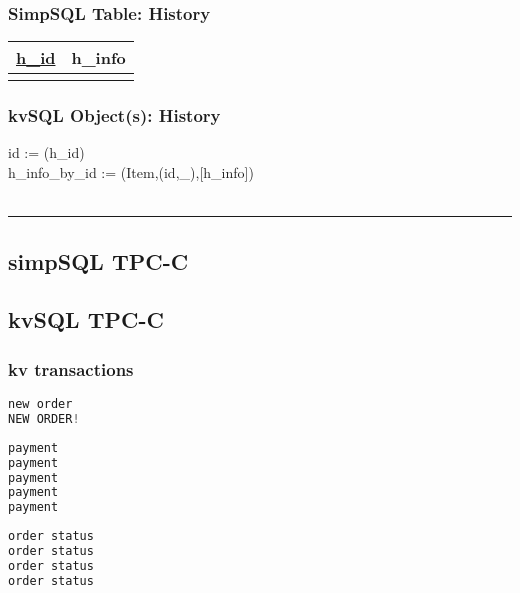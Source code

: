 \documentclass[12pt,letter]{article}
\begin{document}
\subsubsection*{SimpSQL Table: History}  
\begin{tabular}{ |c|c| }
 \hline
 \underline{h\_id} & h\_info\\
 \hline
 &   \\
 \hline
\end{tabular}

\subsubsection*{kvSQL Object(s): History}  
id := (h\_id)\\
 h\_info\_by\_id := 
(Item,(id,\_),[h\_info]) \\
\\
\hrule










\subsection*{simpSQL TPC-C}







\subsection*{kvSQL TPC-C}


\subsubsection{kv transactions}
\begin{lstlisting}[language=Python, caption=NewOrder Transaction]
new order
NEW ORDER!
\end{lstlisting}

\begin{lstlisting}[language=Python, caption=Payment Transaction]
payment
payment
payment
payment
payment
\end{lstlisting}


\begin{lstlisting}[language=Python, caption=OrderStatus Transaction]
order status
order status
order status
order status
\end{lstlisting}
\end{document}
